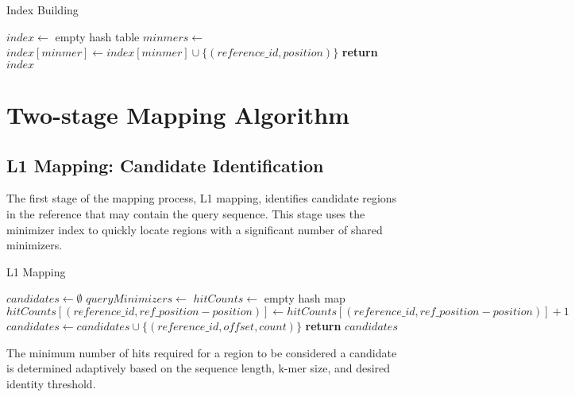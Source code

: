 \documentclass{article}
\begin{document}
\begin{algorithm}
\caption{Index Building}
\begin{algorithmic}[1]
\State $index \gets$ empty hash table
    \State $minmers \gets$ 
        \State $index[minmer] \gets index[minmer] \cup \{(reference\_id, position)\}$
    \EndFor
\EndFor
\State \textbf{return} $index$
\EndProcedure
\end{algorithmic}
\end{algorithm}

\section{Two-stage Mapping Algorithm}

\subsection{L1 Mapping: Candidate Identification}

The first stage of the mapping process, L1 mapping, identifies candidate regions in the reference that may contain the query sequence. This stage uses the minimizer index to quickly locate regions with a significant number of shared minimizers.

\begin{algorithm}
\caption{L1 Mapping}
\begin{algorithmic}[1]
\State $candidates \gets \emptyset$
\State $queryMinimizers \gets$ 
\State $hitCounts \gets$ empty hash map
            \State $hitCounts[(reference\_id, ref\_position - position)] \gets hitCounts[(reference\_id, ref\_position - position)] + 1$
        \EndFor
    \EndIf
\EndFor
{}
        \State $candidates \gets candidates \cup \{(reference\_id, offset, count)\}$
    \EndIf
\EndFor
\State \textbf{return} $candidates$
\EndProcedure
\end{algorithmic}
\end{algorithm}

The minimum number of hits required for a region to be considered a candidate is determined adaptively based on the sequence length, k-mer size, and desired identity threshold.
\end{document}
